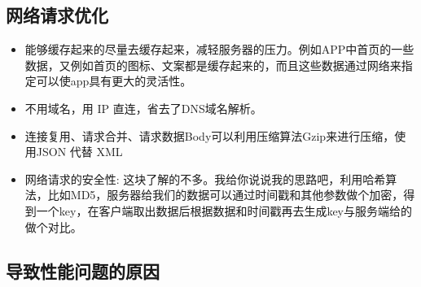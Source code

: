 \documentclass[9pt, b5paper]{article}
\begin{document}
\subsection{网络请求优化}
\label{sec-1-6}
\begin{itemize}
\item 能够缓存起来的尽量去缓存起来，减轻服务器的压力。例如APP中首页的一些数据，又例如首页的图标、文案都是缓存起来的，而且这些数据通过网络来指定可以使app具有更大的灵活性。
\item 不用域名，用 IP 直连，省去了DNS域名解析。
\item 连接复用、请求合并、请求数据Body可以利用压缩算法Gzip来进行压缩，使用JSON 代替 XML
\item 网络请求的安全性: 这块了解的不多。我给你说说我的思路吧，利用哈希算法，比如MD5，服务器给我们的数据可以通过时间戳和其他参数做个加密，得到一个key，在客户端取出数据后根据数据和时间戳再去生成key与服务端给的做个对比。
\end{itemize}

\subsection{导致性能问题的原因}
\label{sec-1-7}
\end{document}
